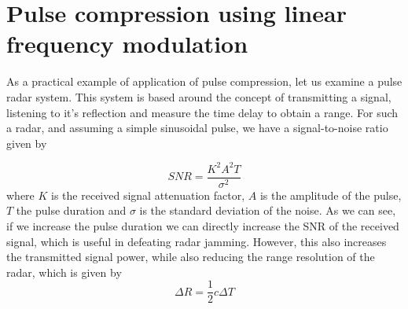 \documentclass[english,purist]{ist-report}
\begin{document}
\section{Pulse compression using linear frequency modulation}

As a practical example of application of pulse compression, let us examine a pulse radar system. This system is based around the concept of transmitting a signal, listening to it's reflection and measure the time delay to obtain a range. For such a radar, and assuming a simple sinusoidal pulse, we have a signal-to-noise ratio given by 

$$
SNR = \frac{K^2 A^2 T}{\sigma^2}
$$
where $K$ is the received signal attenuation factor, $A$ is the amplitude of the pulse, $T$ the pulse duration and $\sigma$ is the standard deviation of the noise. As we can see, if we increase the pulse duration we can directly increase the SNR of the received signal, which is useful in defeating radar jamming. However, this also increases the transmitted signal power, while also reducing the range resolution of the radar, which is given by
$$
\Delta R = \frac{1}{2} c \Delta T
$$
\end{document}
